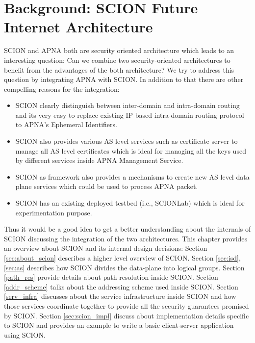 
\chapter{Background: SCION Future Internet Architecture} %

\label{background} %
SCION \cite{PeSzReCh2017, scion_cacm_2017} and APNA both are security oriented architecture which leads to an interesting question: Can we combine two security-oriented architectures to benefit from the advantages of the both architecture? We try to address this question by integrating APNA with SCION. In addition to that there are other compelling reasons for the integration:
\begin{itemize}
    \item SCION clearly distinguish between inter-domain and intra-domain routing and its very easy to replace existing IP based intra-domain routing protocol to APNA's Ephemeral Identifiers.
    \item SCION also provides various AS level services such as certificate server to manage all AS level certificates which is ideal for managing all the keys used by different services inside APNA Management Service.
    \item SCION as framework also provides a mechanisms to create new AS level data plane services which could be used to process APNA packet.
    \item SCION has an existing deployed testbed (i.e., SCIONLab) which is ideal for experimentation purpose.
\end{itemize}

Thus it would be a good idea to get a better understanding about the internals of SCION discussing the integration of the two architectures. This chapter provides an overview about SCION and its internal design decisions: Section \ref{sec:about_scion} describes a higher level overview of SCION. Section \ref{sec:isd}, \ref{sec:as} describes how SCION divides the data-plane into logical groups. Section \ref{path_res} provide details about path resolution inside SCION. Section \ref{addr_scheme} talks about the addressing scheme used inside SCION. Section \ref{serv_infra} discusses about the service infrastructure inside SCION and how those services coordinate together to provide all the security guarantees promised by SCION. Section \ref{sec:scion_impl} discuss about implementation details specific to SCION and provides an example to write a basic client-server application using SCION.

